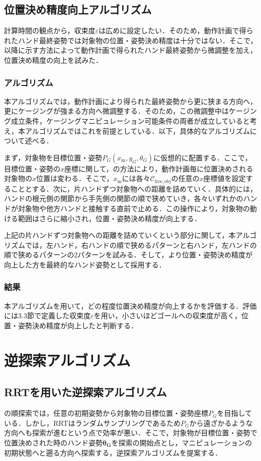\documentclass[a4paper,twoside,12pt,papersize, dvipdfmx]{iirthesis}
\begin{document}
\subsection{位置決め精度向上アルゴリズム}{\label{subsec::planner::formclosure}
計算時間の観点から，収束度$\varepsilon$は広めに設定したい．そのため，動作計画で得られたハンド最終姿勢では対象物の位置・姿勢決め精度は十分ではない．そこで，以降に示す方法によって動作計画で得られたハンド最終姿勢から微調整を加え，位置決め精度の向上を試みた．
\subsubsection{アルゴリズム}
本アルゴリズムでは，動作計画により得られた最終姿勢から更に狭まる方向へ，更にケージングが強まる方向へ微調整する．そのため，この微調整中はケージング成立条件，ケージングマニピュレーション可能条件の両者が成立していると考え，本アルゴリズムではこれを前提としている．以下，具体的なアルゴリズムについて述べる．\par
まず，対象物を目標位置・姿勢$P_G (x_{\mathrm m},y_G,\theta_G)$に仮想的に配置する．ここで，目標位置・姿勢の$x$座標に関して，の方法により，動作計画毎に位置決めされる対象物の$x$位置は変わる．そこで，$x_{\mathrm m}$には各々$\mathcal{C}_{\mathrm{free\_obj}}$の任意の$x$座標値を設定することとする．次に，片ハンドずつ対象物への距離を詰めていく．具体的には，ハンドの根元側の関節から手先側の関節の順で狭めていき，各々いずれかのハンドが対象物や他方ハンドと接触する直前で止める．この操作により，対象物の動ける範囲はさらに縮小され，位置・姿勢決め精度が向上する．\par
上記の片ハンドずつ対象物への距離を詰めていくという部分に関して，本アルゴリズムでは，左ハンド，右ハンドの順で狭めるパターンと右ハンド，左ハンドの順で狭めるパターンの2パターンを試みる．そして，より位置・姿勢決め精度が向上した方を最終的なハンド姿勢として採用する．

\subsubsection{結果}
本アルゴリズムを用いて，どの程度位置決め精度が向上するかを評価する．評価には3.3節で定義した収束度$\varepsilon$を用い，小さいほどゴールへの収束度が高く，位置・姿勢決め精度が向上したと判断する．

\section{逆探索アルゴリズム}\label{sec::planner::reverse}
\subsection{RRTを用いた逆探索アルゴリズム}
の順探索では，任意の初期姿勢から対象物の目標位置・姿勢座標$P_G$を目指している．しかし，RRTはランダムサンプリングであるため$P_G$から遠ざかるような方向へも探索が進むという点で効率が悪い．そこで，対象物が目標位置・姿勢で位置決めされた時のハンド姿勢$\bm{\theta_G}$を探索の開始点とし，マニピュレーションの初期状態へと遡る方向へ探索する，逆探索アルゴリズムを提案する．

}
\end{document}

